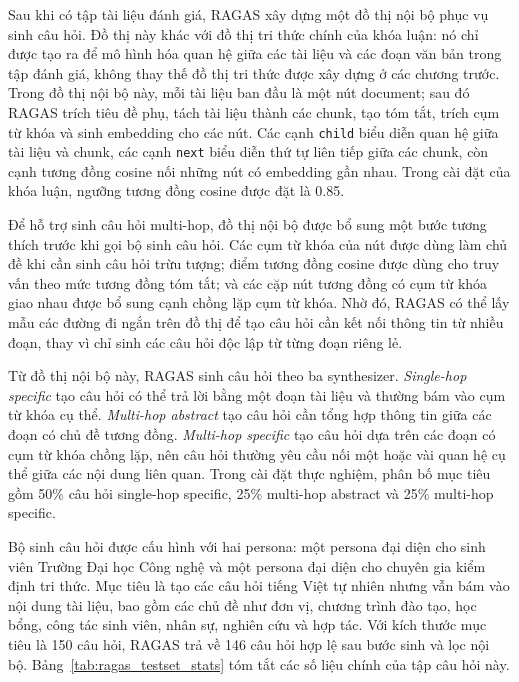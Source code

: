 Sau khi có tập tài liệu đánh giá, RAGAS xây dựng một đồ thị nội bộ phục vụ sinh câu hỏi. Đồ thị này khác với đồ thị tri thức chính của khóa luận: nó chỉ được tạo ra để mô hình hóa quan hệ giữa các tài liệu và các đoạn văn bản trong tập đánh giá, không thay thế đồ thị tri thức được xây dựng ở các chương trước. Trong đồ thị nội bộ này, mỗi tài liệu ban đầu là một nút document; sau đó RAGAS trích tiêu đề phụ, tách tài liệu thành các chunk, tạo tóm tắt, trích cụm từ khóa và sinh embedding cho các nút. Các cạnh \texttt{child} biểu diễn quan hệ giữa tài liệu và chunk, các cạnh \texttt{next} biểu diễn thứ tự liên tiếp giữa các chunk, còn cạnh tương đồng cosine nối những nút có embedding gần nhau. Trong cài đặt của khóa luận, ngưỡng tương đồng cosine được đặt là 0.85.

Để hỗ trợ sinh câu hỏi multi-hop, đồ thị nội bộ được bổ sung một bước tương thích trước khi gọi bộ sinh câu hỏi. Các cụm từ khóa của nút được dùng làm chủ đề khi cần sinh câu hỏi trừu tượng; điểm tương đồng cosine được dùng cho truy vấn theo mức tương đồng tóm tắt; và các cặp nút tương đồng có cụm từ khóa giao nhau được bổ sung cạnh chồng lặp cụm từ khóa. Nhờ đó, RAGAS có thể lấy mẫu các đường đi ngắn trên đồ thị để tạo câu hỏi cần kết nối thông tin từ nhiều đoạn, thay vì chỉ sinh các câu hỏi độc lập từ từng đoạn riêng lẻ.

Từ đồ thị nội bộ này, RAGAS sinh câu hỏi theo ba synthesizer. \textit{Single-hop specific} tạo câu hỏi có thể trả lời bằng một đoạn tài liệu và thường bám vào cụm từ khóa cụ thể. \textit{Multi-hop abstract} tạo câu hỏi cần tổng hợp thông tin giữa các đoạn có chủ đề tương đồng. \textit{Multi-hop specific} tạo câu hỏi dựa trên các đoạn có cụm từ khóa chồng lặp, nên câu hỏi thường yêu cầu nối một hoặc vài quan hệ cụ thể giữa các nội dung liên quan. Trong cài đặt thực nghiệm, phân bố mục tiêu gồm 50\% câu hỏi single-hop specific, 25\% multi-hop abstract và 25\% multi-hop specific.

Bộ sinh câu hỏi được cấu hình với hai persona: một persona đại diện cho sinh viên Trường Đại học Công nghệ và một persona đại diện cho chuyên gia kiểm định tri thức. Mục tiêu là tạo các câu hỏi tiếng Việt tự nhiên nhưng vẫn bám vào nội dung tài liệu, bao gồm các chủ đề như đơn vị, chương trình đào tạo, học bổng, công tác sinh viên, nhân sự, nghiên cứu và hợp tác. Với kích thước mục tiêu là 150 câu hỏi, RAGAS trả về 146 câu hỏi hợp lệ sau bước sinh và lọc nội bộ. Bảng~\ref{tab:ragas_testset_stats} tóm tắt các số liệu chính của tập câu hỏi này.

